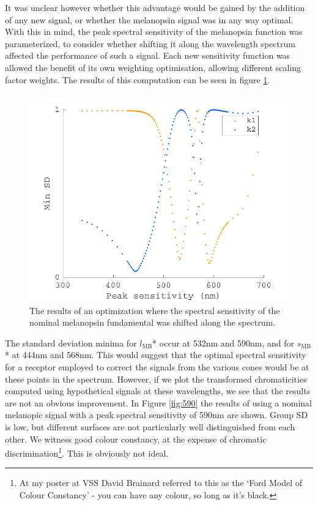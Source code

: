 It was unclear however whether this advantage would be gained by the addition of any new signal, or whether the melanopsin signal was in any way optimal. With this in mind, the peak spectral sensitivity of the melanopsin function was parameterized, to consider whether shifting it along the wavelength spectrum affected the performance of such a signal. Each new sensitivity function was allowed the benefit of its own weighting optimisation, allowing different scaling factor weights. The results of this computation can be seen in figure \ref{fig:opt}. 

\begin{figure}[htbp]
    \includegraphics[max width=\textwidth]{figs/comp/transformToIllIndSpace/offsetrange1.pdf}
    \caption{The results of an optimization where the spectral sensitivity of the nominal melanopsin fundamental was shifted along the spectrum.}
    \label{fig:opt}
\end{figure} 

The standard deviation minima for $l_{\text{MB}}$* occur at 532nm and 590nm, and for $s_{\text{MB}}$* at 444nm and 568nm. This would suggest that the optimal spectral sensitivity for a receptor employed to correct the signals from the various cones would be at these points in the spectrum. However, if we plot the transformed chromaticities computed using hypothetical signals at these wavelengths, we see that the results are not an obvious improvement. In Figure \ref{fig:590} the results of using a nominal melanopic signal with a peak spectral sensitivity of 590nm are shown. Group SD is low, but different surfaces are not particularly well distinguished from each other. We witness good colour constancy, at the expense of chromatic discrimination\footnote{At my poster at VSS David Brainard referred to this as the `Ford Model of Colour Constancy' - you can have any colour, so long as it's black.}. This is obviously not ideal.

